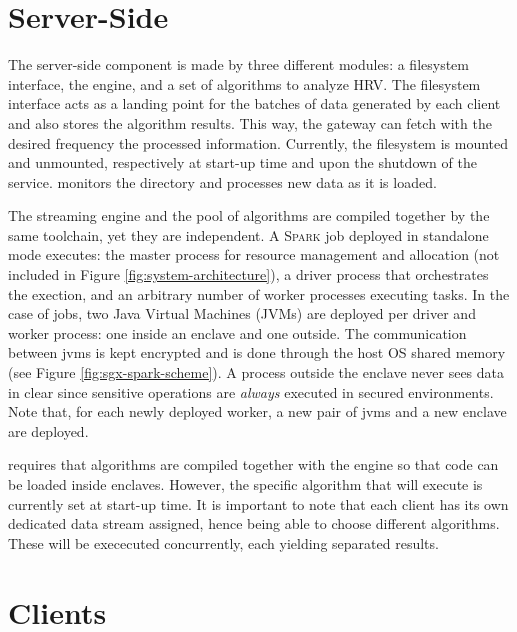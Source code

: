 \section{Server-Side} \label{sec:server}

The server-side component is made by three different modules: a filesystem interface, the \sgxspark engine, and a set of algorithms to analyze HRV. 
The filesystem interface acts as a landing point for the batches of data generated by each client and also stores the algorithm results.
This way, the gateway can fetch with the desired frequency the processed information.
Currently, the filesystem is mounted and unmounted, respectively at start-up time and upon the shutdown of the service. 
\sgxspark monitors the directory and processes new data as it is loaded.

The streaming engine and the pool of algorithms are compiled together by the same toolchain, yet they are independent. 
A \textsc{Spark} job deployed in standalone mode executes: the master process for resource management and allocation (not included in Figure \ref{fig:system-architecture}), a driver process that orchestrates the exection, and an arbitrary number of worker processes executing tasks.
In the case of \sgxspark jobs, two Java Virtual Machines (JVMs) are deployed per driver and worker process: one inside an enclave and one outside.
The communication between \acrshort{jvm}s is kept encrypted and is done through the host OS shared memory (see Figure \ref{fig:sgx-spark-scheme}).
A process outside the enclave never sees data in clear since sensitive operations are \emph{always} executed in secured environments.
Note that, for each newly deployed worker, a new pair of \acrshort{jvm}s and a new enclave are deployed.

\sgxspark requires that algorithms are compiled together with the engine so that code can be loaded inside enclaves.
However, the specific algorithm that \projName will execute is currently set at start-up time.
It is important to note that each client has its own dedicated data stream assigned, hence being able to choose different algorithms.
These will be exececuted concurrently, each yielding separated results. 

\section{Clients} \label{sec:clients}

